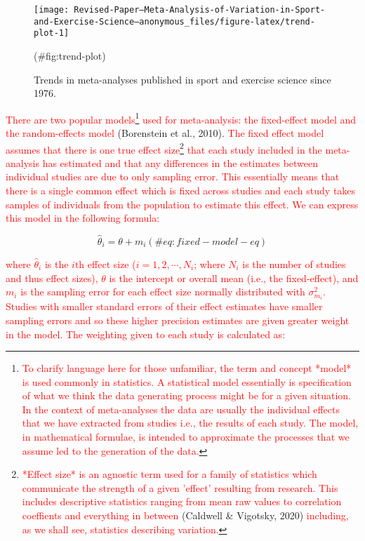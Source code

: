 \documentclass[
]{article}
\begin{document}
\begin{figure}

{\centering \texttt{[image: Revised-Paper---Meta-Analysis-of-Variation-in-Sport-and-Exercise-Science---anonymous\_files/figure-latex/trend-plot-1]} 

}

\caption{Trends in meta-analyses published in sport and exercise science since 1976.}(\#fig:trend-plot)
\end{figure}

\textcolor{red}{There are two popular models}\footnote{\textcolor{red}{To clarify language here for those unfamiliar, the term and concept *model* is used commonly in statistics. A statistical model essentially is specification of what we think the data generating process might be for a given situation. In the context of meta-analyses the data are usually the individual effects that we have extracted from studies i.e., the results of each study. The model, in mathematical formulae, is intended to approximate the processes that we assume led to the generation of the data.}} \textcolor{red}{used for meta-analysis: the fixed-effect model and the random-effects model} (Borenstein et al., 2010). \textcolor{red}{The fixed effect model assumes that there is one true effect size}\footnote{\textcolor{red}{*Effect size* is an agnostic term used for a family of statistics which communicate the strength of a given 'effect' resulting from research. This includes descriptive statistics ranging from mean raw values to correlation coeffients and everything in between} (Caldwell \& Vigotsky, 2020) \textcolor{red}{including, as we shall see, statistics describing variation.}} \textcolor{red}{that each study included in the meta-analysis has estimated and that any differences in the estimates between individual studies are due to only sampling error. This essentially means that there is a single common effect which is fixed across studies and each study takes samples of individuals from the population to estimate this effect. We can express this model in the following formula:}

\begin{equation}
\hat\theta_{i}=\theta+m_{i} 
(\#eq:fixed-model-eq)
\end{equation}

\textcolor{red}{where $\hat\theta_{i}$ is the $i\textrm{th}$ effect size ($i = 1,2,\cdots,N_{i}$; where $N_{i}$ is the number of studies and thus effect sizes), $\theta$ is the intercept or overall mean (i.e., the fixed-effect), and $m_{i}$ is the sampling error for each effect size normally distributed with $\sigma^2_{m_{i}}$. Studies with smaller standard errors of their effect estimates have smaller sampling errors and so these higher precision estimates are given greater weight in the model. The weighting given to each study is calculated as:}
\end{document}
